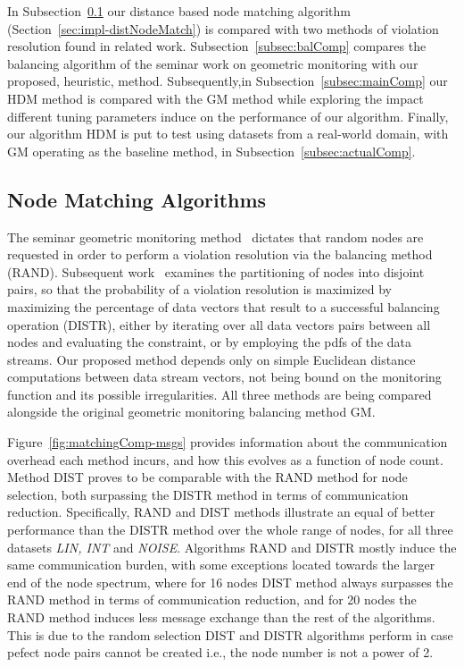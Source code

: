 In Subsection~\ref{subsec:matchingComp} our distance based node matching algorithm (Section~\ref{sec:impl-distNodeMatch}) is compared with two methods of violation resolution found in related work. Subsection~\ref{subsec:balComp} compares the balancing algorithm of the seminar work on geometric monitoring with our proposed, heuristic, method. Subsequently,in Subsection~\ref{subsec:mainComp} our HDM method is compared with the GM method while exploring the impact different tuning parameters induce on the performance of our algorithm. Finally, our algorithm HDM is put to test using datasets from a real-world domain, with GM operating as the baseline method, in Subsection~\ref{subsec:actualComp}.

\subsection{Node Matching Algorithms} \label{subsec:matchingComp}

The seminar geometric monitoring method~\cite{Sharfman2006GM} dictates that random nodes are requested in order to perform a violation resolution via the balancing method (RAND). Subsequent work~\cite{Keren2014GMHetStreams} examines the partitioning of nodes into disjoint pairs, so that the probability of a violation resolution is maximized by maximizing the percentage of data vectors that result to a successful balancing operation (DISTR), either by iterating over all data vectors pairs between all nodes and evaluating the constraint, or by employing the pdfs of the data streams. Our proposed method depends only on simple Euclidean distance computations between data stream vectors, not being bound on the monitoring function and its possible irregularities. All three methods are being compared alongside the original geometric monitoring balancing method GM.

Figure~\ref{fig:matchingComp-msgs} provides information about the communication overhead each method incurs, and how this evolves as a function of node count. Method DIST proves to be comparable with the RAND method for node selection, both surpassing the DISTR method in terms of communication reduction. Specifically, RAND and DIST methods illustrate an equal of better performance than the DISTR method over the whole range of nodes, for all three datasets \emph{LIN, INT} and \emph{NOISE}. Algorithms RAND and DISTR mostly induce the same communication burden, with some exceptions located towards the larger end of the node spectrum, where for 16 nodes DIST method always surpasses the RAND method in terms of communication reduction, and for 20 nodes the RAND method induces less message exchange than the rest of the algorithms. This is due to the random selection DIST and DISTR algorithms perform in case pefect node pairs cannot be created i.e., the node number is not a power of 2.

